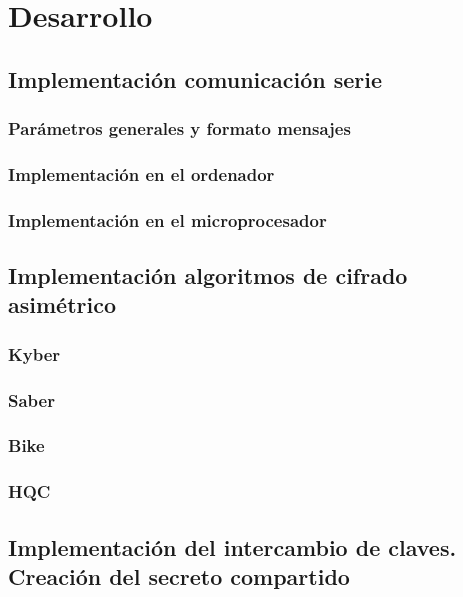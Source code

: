 \chapter{Desarrollo}
\section{Implementación comunicación serie}
\subsection{Parámetros generales y formato mensajes}
\subsection{Implementación en el ordenador}
\subsection{Implementación en el microprocesador}
\section{Implementación algoritmos de cifrado asimétrico}
\subsection{Kyber}
\subsection{Saber}
\subsection{Bike}
\subsection{HQC}
\section{Implementación del intercambio de claves. Creación del secreto compartido}